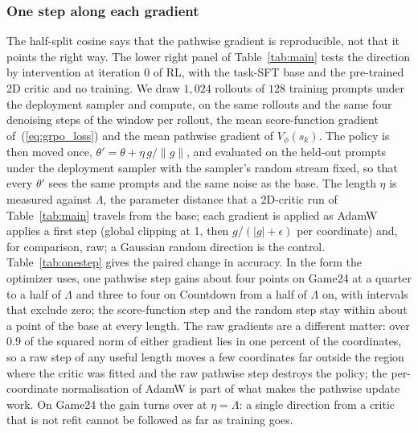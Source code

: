\fi


\subsubsection{One step along each gradient}
\label{app:onestep}
The half-split cosine says that the pathwise gradient is reproducible, not that it points the right way. The lower right panel of Table~\ref{tab:main} tests the direction by intervention at iteration 0 of RL, with the task-SFT base and the pre-trained 2D critic and no training. We draw $1{,}024$ rollouts of $128$ training prompts under the deployment sampler and compute, on the same rollouts and the same four denoising steps of the window per rollout, the mean score-function gradient of~(\ref{eq:grpo_loss}) and the mean pathwise gradient of $V_\phi(s_k)$. The policy is then moved once, $\theta'=\theta+\eta\,g/\lVert g\rVert$, and evaluated on the held-out prompts under the deployment sampler with the sampler's random stream fixed, so that every $\theta'$ sees the same prompts and the same noise as the base. The length $\eta$ is measured against $\Lambda$, the parameter distance that a 2D-critic run of Table~\ref{tab:main} travels from the base; each gradient is applied as AdamW applies a first step (global clipping at 1, then $g/(|g|+\epsilon)$ per coordinate) and, for comparison, raw; a Gaussian random direction is the control. Table~\ref{tab:onestep} gives the paired change in accuracy. In the form the optimizer uses, one pathwise step gains about four points on Game24 at a quarter to a half of $\Lambda$ and three to four on Countdown from a half of $\Lambda$ on, with intervals that exclude zero; the score-function step and the random step stay within about a point of the base at every length. The raw gradients are a different matter: over $0.9$ of the squared norm of either gradient lies in one percent of the coordinates, so a raw step of any useful length moves a few coordinates far outside the region where the critic was fitted and the raw pathwise step destroys the policy; the per-coordinate normalisation of AdamW is part of what makes the pathwise update work. On Game24 the gain turns over at $\eta{=}\Lambda$: a single direction from a critic that is not refit cannot be followed as far as training goes.

